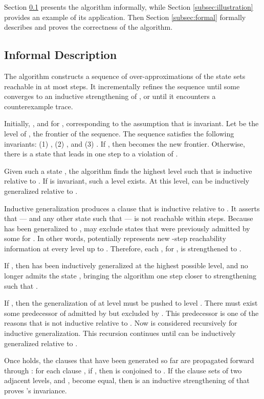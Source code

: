 \documentclass{llncs}
\begin{document}
Section \ref{subsec:informal} presents the algorithm informally, while
Section \ref{subsec:illustration} provides an example of its
application.  Then Section \ref{subsec:formal} formally describes and
proves the correctness of the algorithm.

\subsection{Informal Description}
\label{subsec:informal}

The algorithm constructs a sequence  of
over-approximations of the state sets reachable in at most  steps.  It incrementally refines the sequence until some 
converges to an inductive strengthening of , or until it encounters
a counterexample trace.

Initially, , and  for , corresponding to the
assumption that  is invariant.  Let  be the level of , the
frontier of the sequence.  The sequence satisfies the following
invariants: (1) , (2) , and (3) .  If , then 
becomes the new frontier.  Otherwise, there is a state  that leads
in one step to a violation of .

Given such a state , the algorithm finds the highest level  such that  is inductive relative to .  If 
is invariant, such a level exists.  At this level,  can be
inductively generalized relative to .

Inductive generalization produces a clause  that
is inductive relative to .  It asserts that  --- and any
other state  such that  --- is not reachable
within  steps.  Because  has been generalized to ,
 may exclude states that were previously admitted by some  for
.  In other words,  potentially represents new -step
reachability information at every level  up to .  Therefore,
each , for , is strengthened to .

If , then  has been inductively generalized at the highest
possible level, and  no longer admits the state , bringing the
algorithm one step closer to strengthening  such that .

If , then the generalization of  at level  must be pushed
to level .  There must exist some predecessor  of  admitted
by  but excluded by .  This predecessor is one of the
reasons that  is not inductive relative to .  Now
 is considered recursively for inductive generalization.  This
recursion continues until  can be inductively generalized relative
to .

Once  holds, the clauses that have been
generated so far are propagated forward through
: for each clause , if , then  is
conjoined to .  If the clause sets of two adjacent levels,
 and , become equal, then  is an inductive
strengthening of  that proves 's invariance.
\end{document}
